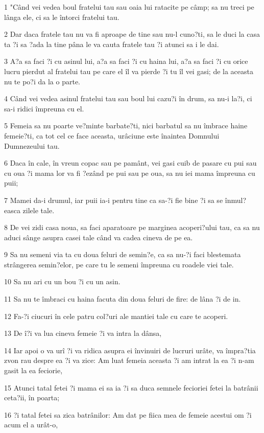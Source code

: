\par 1 "Când vei vedea boul fratelui tau sau oaia lui ratacite pe câmp; sa nu treci pe lânga ele, ci sa le întorci fratelui tau.
\par 2 Dar daca fratele tau nu va fi aproape de tine sau nu-l cuno?ti, sa le duci la casa ta ?i sa ?ada la tine pâna le va cauta fratele tau ?i atunci sa i le dai.
\par 3 A?a sa faci ?i cu asinul lui, a?a sa faci ?i cu haina lui, a?a sa faci ?i cu orice lucru pierdut al fratelui tau pe care el îl va pierde ?i tu îl vei gasi; de la aceasta nu te po?i da la o parte.
\par 4 Când vei vedea asinul fratelui tau sau boul lui cazu?i în drum, sa nu-i la?i, ci sa-i ridici împreuna cu el.
\par 5 Femeia sa nu poarte ve?minte barbate?ti, nici barbatul sa nu îmbrace haine femeie?ti, ca tot cel ce face aceasta, urâciune este înaintea Domnului Dumnezeului tau.
\par 6 Daca în cale, în vreun copac sau pe pamânt, vei gasi cuib de pasare cu pui sau cu oua ?i mama lor va fi ?ezând pe pui sau pe oua, sa nu iei mama împreuna cu puii;
\par 7 Mamei da-i drumul, iar puii ia-i pentru tine ca sa-?i fie bine ?i sa se înmul?easca zilele tale.
\par 8 De vei zidi casa noua, sa faci aparatoare pe marginea acoperi?ului tau, ca sa nu aduci sânge asupra casei tale când va cadea cineva de pe ea.
\par 9 Sa nu semeni via ta cu doua feluri de semin?e, ca sa nu-?i faci blestemata strângerea semin?elor, pe care tu le semeni împreuna cu roadele viei tale.
\par 10 Sa nu ari cu un bou ?i cu un asin.
\par 11 Sa nu te îmbraci cu haina facuta din doua feluri de fire: de lâna ?i de in.
\par 12 Fa-?i ciucuri în cele patru col?uri ale mantiei tale cu care te acoperi.
\par 13 De î?i va lua cineva femeie ?i va intra la dânsa,
\par 14 Iar apoi o va urî ?i va ridica asupra ei învinuiri de lucruri urâte, va împra?tia zvon rau despre ea ?i va zice: Am luat femeia aceasta ?i am intrat la ea ?i n-am gasit la ea feciorie,
\par 15 Atunci tatal fetei ?i mama ei sa ia ?i sa duca semnele fecioriei fetei la batrânii ceta?ii, în poarta;
\par 16 ?i tatal fetei sa zica batrânilor: Am dat pe fiica mea de femeie acestui om ?i acum el a urât-o,
